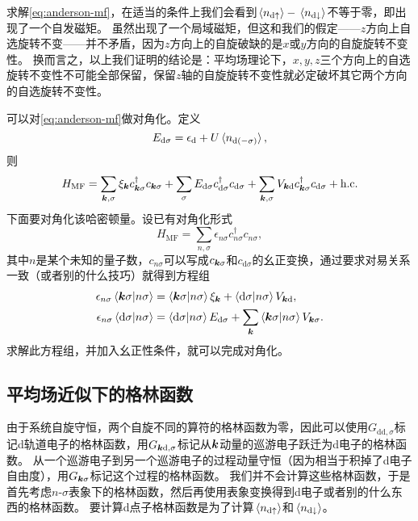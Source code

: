 求解\eqref{eq:anderson-mf}，在适当的条件上我们会看到$\expval*{{n}_{\text{d} \uparrow}} - \expval*{{n}_{\text{d} \downarrow}}$不等于零，即出现了一个自发磁矩。
虽然出现了一个局域磁矩，但这和我们的假定——$z$方向上自选旋转不变——并不矛盾，因为$z$方向上的自旋破缺的是$x$或$y$方向的自旋旋转不变性。
换而言之，以上我们证明的结论是：平均场理论下，$x, y, z$三个方向上的自选旋转不变性不可能全部保留，保留$z$轴的自旋旋转不变性就必定破坏其它两个方向的自选旋转不变性。

可以对\eqref{eq:anderson-mf}做对角化。定义
\begin{equation}
    E_{\text{d} \sigma} = \epsilon_\text{d} + U \expval*{{n}_{\text{d} (-\sigma)}},
    \label{eq:energy-d-sigma}
\end{equation}
则
\begin{equation}
    {H}_\text{MF} = \sum_{\vb*{k}, \sigma} \xi_{\vb*{k}} {c}_{\vb*{k}\sigma}^\dagger {c}_{\vb*{k} \sigma} + \sum_\sigma E_{\text{d} \sigma} {c}_{\text{d}\sigma}^\dagger {c}_{\text{d} \sigma} + \sum_{\vb*{k}, \sigma} V_{\vb*{k} \text{d}} {c}_{\vb*{k} \sigma}^\dagger {c}_{\text{d} \sigma} + \text{h.c.}
\end{equation}
下面要对角化该哈密顿量。设已有对角化形式
\[
    {H}_\text{MF} = \sum_{n, \sigma} \epsilon_{n \sigma} {c}^\dagger_{n\sigma} {c}_{n\sigma},
\]
其中$n$是某个未知的量子数，${c}_{n \sigma}$可以写成${c}_{\vb*{k} \sigma}$和${c}_{\text{d} \sigma}$的幺正变换，通过要求对易关系一致（或者别的什么技巧）就得到方程组
\begin{equation}
    \begin{aligned}
        \epsilon_{n\sigma} \braket{\vb*{k}\sigma}{n \sigma} &= \braket{\vb*{k} \sigma}{n \sigma} \xi_{\vb*{k}} + \braket{\text{d} \sigma}{n \sigma} V_{\vb*{k} \text{d}}, \\
        \epsilon_{n \sigma} \braket{\text{d} \sigma}{n \sigma} &= \braket{\text{d} \sigma}{n \sigma} E_{\text{d} \sigma} + \sum_{\vb*{k}} \braket{\vb*{k} \sigma}{n \sigma} V_{\vb*{k} \sigma}.
    \end{aligned}
\end{equation}
求解此方程组，并加入幺正性条件，就可以完成对角化。

\subsection{平均场近似下的格林函数}

由于系统自旋守恒，两个自旋不同的算符的格林函数为零，因此可以使用$G_{\text{dd}, \sigma}$标记d轨道电子的格林函数，用$G_{\vb*{k} \text{d}, \sigma}$标记从$\vb*{k}$动量的巡游电子跃迁为d电子的格林函数。
从一个巡游电子到另一个巡游电子的过程动量守恒（因为相当于积掉了d电子自由度），用$G_{\vb*{k}\sigma}$标记这个过程的格林函数。
我们并不会计算这些格林函数，于是首先考虑$n$-$\sigma$表象下的格林函数，然后再使用表象变换得到d电子或者别的什么东西的格林函数。
要计算d点子格林函数是为了计算$\expval*{{n}_{\text{d}\uparrow}}$和$\expval*{{n}_{\text{d}\downarrow}}$。

